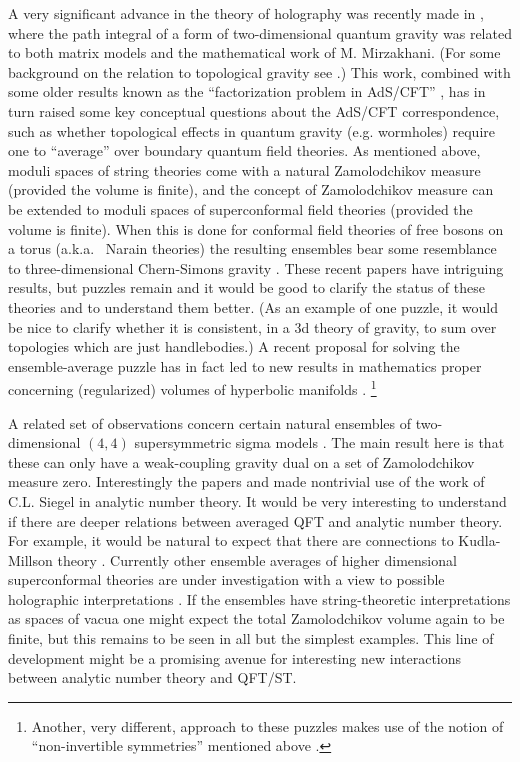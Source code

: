 \documentclass[12pt]{article}
\begin{document}
A very significant advance in the theory of holography was recently made in \cite{Saad:2019lba,Stanford:2019vob,Mertens:2022irh},
where the path integral of a form of two-dimensional quantum gravity was related
to both matrix models and the mathematical work of M. Mirzakhani. (For some background
on the relation to topological gravity see  \cite{Dijkgraaf:2018vnm}.)    This work, 
combined with some older results known as the ``factorization problem in AdS/CFT''  \cite{Witten:1999xp,Maldacena:2004rf}, 
has in turn raised some key conceptual questions about the AdS/CFT correspondence,
such as whether topological 
effects in quantum gravity (e.g. wormholes)
require one to ``average'' over boundary quantum field theories.  
As mentioned above, moduli spaces of string theories come with a 
natural Zamolodchikov measure (provided the volume is finite), 
and the concept of Zamolodchikov measure can be extended to moduli 
spaces of superconformal field theories (provided the volume is finite). 
 When this is done for conformal field theories
of free bosons on a torus (a.k.a.~ Narain theories) the resulting ensembles bear some resemblance to three-dimensional Chern-Simons gravity \cite{Afkhami-Jeddi:2020ezh,Maloney:2020nni}.
 These recent papers have intriguing results, 
 but puzzles remain \cite{Benjamin:2021wzr} and it would be good
to clarify the status of these theories and to understand them better.
(As an example of one puzzle, it would be nice to clarify whether it is 
consistent, in a 3d theory of gravity, to sum over topologies which are 
just handlebodies.) 
A recent proposal for solving the ensemble-average puzzle
has in fact led to new results in mathematics proper concerning (regularized) volumes of hyperbolic manifolds \cite{Schlenker:2022dyo}. 
%
\footnote{Another, very different, approach to these puzzles makes use of the notion of ``non-invertible symmetries'' mentioned above \cite{Benini:2022hzx}. } 
%


A related set of observations concern certain natural ensembles of two-dimensional 
$(4,4)$ supersymmetric sigma models \cite{Benjamin:2015hsa,Moore:2015bba}.
The main result here is that these can only have  a weak-coupling gravity dual 
on a set of Zamolodchikov measure zero.  Interestingly 
the papers \cite{Afkhami-Jeddi:2020ezh,Maloney:2020nni} and 
\cite{Benjamin:2015hsa,Moore:2015bba}  made nontrivial use of the work of C.L. Siegel in analytic number theory. It would be very interesting to understand if there are deeper relations between averaged QFT and analytic number theory. For example, it would be natural to expect that there are connections to Kudla-Millson theory \cite{KudlaMillson}. Currently other ensemble averages of higher dimensional superconformal theories are under investigation with a view to possible holographic interpretations \cite{Collier:2022emf}. If the ensembles have string-theoretic 
interpretations as spaces of vacua one might expect the total 
Zamolodchikov volume again to be finite, but this remains to be 
seen in all but the simplest examples. This line of development 
might be a promising avenue for interesting new interactions between analytic number theory and QFT/ST. 
\end{document}
